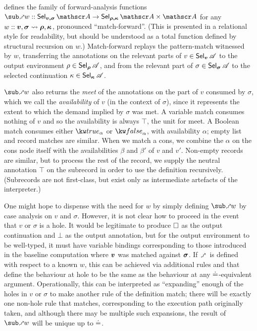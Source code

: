  defines the family of forward-analysis functions $\matchFwdF{w} :: \Sel{v, \sigma}{A} \to \Prod{\Sel{\rho, \kappa}{A}}{\Ann{A}}$ for any $w :: \bm{v}, \bm{\sigma} \rightsquigarrow \bm{\rho}, \bm{\kappa}$, pronounced ``match-forward''. (This is presented in a relational style for readability, but should be understood as a total function defined by structural recursion on $w$.) Match-forward replays the pattern-match witnessed by $w$, transferring the annotations on the relevant parts of $v \in \textup{\textsf{Sel}}_{\bm{v}}\,{\mathscr{A}}$ to the output environment $\rho \in \textup{\textsf{Sel}}_{\bm{\rho}}\,{\mathscr{A}}$, and from the relevant part of $\sigma \in \textup{\textsf{Sel}}_{\bm{\sigma}}\,{\mathscr{A}}$ to the selected continuation $\kappa \in \textup{\textsf{Sel}}_{\bm{\kappa}}\,{\mathscr{A}}$.

$\matchFwdF{w}$ also returns the \emph{meet} of the annotations on the part of $v$ consumed by $\sigma$, which we call the \emph{availability} of $v$ (in the context of $\sigma$), since it represents the extent to which the demand implied by $\sigma$ was met. A variable match consumes nothing of $v$ and so the availability is always $\top$, the unit for meet. A Boolean match consumes either $\annot{\exTrue}{\alpha}$ or $\annot{\exFalse}{\alpha}$, with availability $\alpha$; empty list and record matches are similar. When we match a cons, we combine the $\alpha$ on the cons node itself with the availabilities $\beta$ and $\beta'$ of $v$ and $v'$. Non-empty records are similar, but to process the rest of the record, we supply the neutral annotation $\top$ on the subrecord in order to use the definition recursively. (Subrecords are not first-class, but exist only as intermediate artefacts of the interpreter.)

One might hope to dispense with the need for $w$ by simply defining $\matchFwdF{w}$ by case analysis on $v$ and $\sigma$. However, it is not clear how to proceed in the event that $v$ or $\sigma$ is a hole. It would be legitimate to produce $\square$ as the output continuation and $\bot$ as the output annotation, but for the output environment to be well-typed, it must have variable bindings corresponding to those introduced in the baseline computation where $\bm{v}$ was matched against $\bm{\sigma}$. If $\matchFwdS$ is defined with respect to a known $w$, this can be achieved via additional rules  and  that define the behaviour at hole to be the same as the behaviour at any $\doteq$-equivalent argument. Operationally, this can be interpreted as ``expanding'' enough of the holes in $v$ or $\sigma$ to make another rule of the definition match; there will be exactly one non-hole rule that matches, corresponding to the execution path originally taken, and although there may be multiple such expansions, the result of $\matchFwdF{w}$ will be unique up to $\doteq$.

